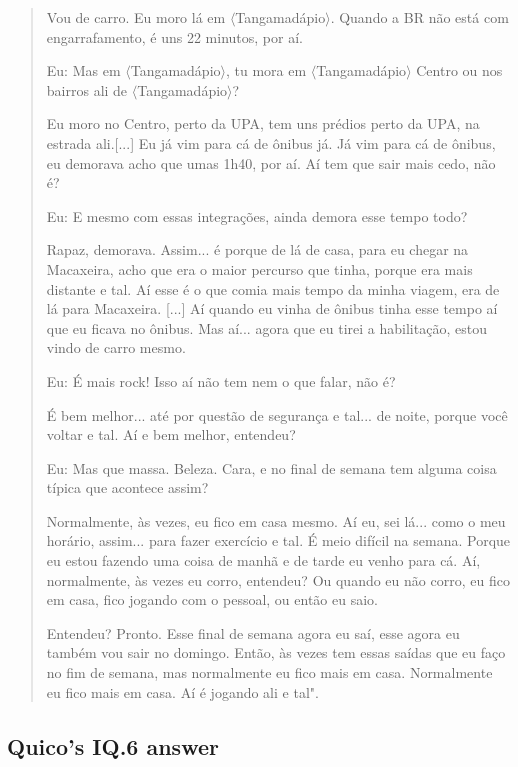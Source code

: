 \begin{quote}
    Vou de carro. Eu moro lá em $\langle$Tangamadápio$\rangle$. Quando a BR não está com engarrafamento, é uns 22 minutos, por aí.

    \colorbox{black!15}{Eu: Mas em $\langle$Tangamadápio$\rangle$, tu mora em $\langle$Tangamadápio$\rangle$ Centro ou nos bairros ali de $\langle$Tangamadápio$\rangle$?}
    
    Eu moro no Centro, perto da UPA, tem uns prédios perto da UPA, na estrada ali.[...] Eu já vim para cá de ônibus já. Já vim para cá de ônibus, eu demorava acho que umas 1h40, por aí. Aí tem que sair mais cedo, não é? 

    \colorbox{black!15}{Eu: E mesmo com essas integrações, ainda demora esse tempo todo?}

    Rapaz, demorava. Assim... é porque de lá de casa, para eu chegar na Macaxeira, acho que era o maior percurso que tinha, porque era mais distante e tal. Aí esse é o que comia mais tempo da minha viagem, era de lá para Macaxeira. [...] Aí quando eu vinha de ônibus tinha esse tempo aí que eu ficava no ônibus. Mas aí... agora que eu tirei a habilitação, estou vindo de carro mesmo. 

    \colorbox{black!15}{Eu: É mais rock! Isso aí não tem nem o que falar, não é?}

    É bem melhor... até por questão de segurança e tal... de noite, porque você voltar e tal. Aí e bem melhor, entendeu?
    
    \colorbox{black!15}{Eu: Mas que massa. Beleza. Cara, e no final de semana tem alguma coisa típica}
    \colorbox{black!15}{que acontece assim?}

    Normalmente, às vezes, eu fico em casa mesmo. Aí eu, sei lá... como o meu horário, assim... para fazer exercício e tal. É meio difícil na semana. Porque eu estou fazendo uma coisa de manhã e de tarde eu venho para cá. Aí, normalmente, às vezes eu corro, entendeu? Ou quando eu não corro, eu fico em casa, fico jogando com o pessoal, ou então eu saio.

    Entendeu? Pronto. Esse final de semana agora eu saí, esse agora eu também vou sair no domingo. Então, às vezes tem essas saídas que eu faço no fim de semana, mas normalmente eu fico mais em casa. Normalmente eu fico mais em casa. Aí é jogando ali e tal".
\end{quote}

\subsection{Quico’s IQ.6 answer}
\label{interview-exc-ss:quico-iq6}

